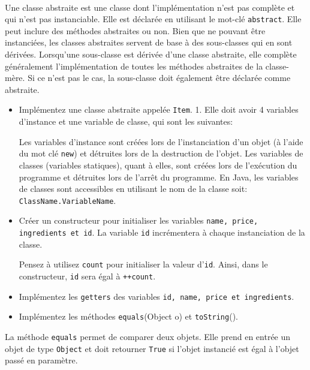 \begin{Exercice}[10 minutes]\\

Une classe abstraite est une classe dont l'implémentation n'est pas complète et qui n'est pas instanciable. Elle est déclarée en utilisant le mot-clé \lstinline{abstract}. Elle peut inclure des méthodes abstraites ou non. Bien que ne pouvant être instanciées, les classes abstraites servent de base à des sous-classes qui en sont dérivées.
Lorsqu'une sous-classe est dérivée d'une classe abstraite, elle complète généralement l'implémentation de toutes les méthodes abstraites de la classe-mère. Si ce n'est pas le cas, la sous-classe doit également être déclarée comme abstraite.

 

\begin{itemize}
    \item Implémentez une classe abstraite appelée \lstinline{Item}.
    1. Elle doit avoir 4 variables d'instance et une variable de classe, qui sont les suivantes:
     
    \begin{conseil}
        Les variables d'instance sont créées lors de l'instanciation d'un objet (à l'aide du mot clé \lstinline{new}) et détruites lors de la destruction de l'objet. Les variables de classes (variables statiques), quant à elles, sont créées lors de l'exécution du programme et détruites lors de l'arrêt du programme. En Java, les variables de classes sont accessibles en utilisant le nom de la classe soit: \lstinline{ClassName.VariableName}.
    \end{conseil}
    \item Créer un constructeur pour initialiser les variables \lstinline{name, price, ingredients et id}. La variable \lstinline{id} incrémentera à chaque instanciation de la classe.
    \begin{conseil}
        Pensez à utilisez \lstinline{count} pour initialiser la valeur d'\lstinline{id}. Ainsi, dans le constructeur, \lstinline{id} sera égal à \lstinline{++count}.
    \end{conseil}
    \item Implémentez les \lstinline{getters} des variables \lstinline{id, name, price et ingredients}.
    \item Implémentez les méthodes \lstinline{equals}(Object o) et \lstinline{toString}().
\end{itemize}
\begin{conseil}
La méthode \lstinline{equals} permet de comparer deux objets. Elle prend en entrée un objet de type \lstinline{Object} et doit retourner \lstinline{True} si l'objet instancié est égal à l'objet passé en paramètre.
\end{conseil}
    \begin{solution}  
         
    \end{solution}
\end{Exercice}



